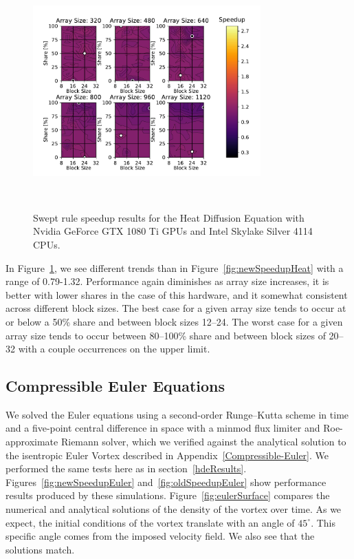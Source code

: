 \documentclass[preprints,article,accept,moreauthors,pdftex]{Definitions/mdpi}
\def\oldCPU{Intel Skylake Silver 4114} %
\def\oldGPU{Nvidia GeForce GTX 1080 Ti}
\begin{document}
\begin{figure}[htbp]
    \centering
    \includegraphics[height=9cm,width=0.78\textwidth, trim={0.75cm 0.4cm 0.8cm 0.7cm},clip]{figs/speedUpheatOld.pdf}
    \caption{Swept rule speedup results for the Heat Diffusion Equation with \oldGPU{} GPUs and \oldCPU{} CPUs.}
    \label{fig:oldSpeedupHeat} 
\end{figure}


In Figure~\ref{fig:oldSpeedupHeat}, we see different trends than in Figure~\ref{fig:newSpeedupHeat} with a range of 0.79-1.32. 
Performance again diminishes as array size increases, it is better with lower shares in the case of this hardware, and it somewhat consistent across different block sizes. The best case for a given array size tends to occur at or below a 50\% share and between block sizes 12--24. 
The worst case for a given array size tends to occur between 80--100\% share and between block sizes of 20--32 with a couple occurrences on the upper limit.

\subsection{Compressible Euler Equations}
\label{eulerVortexResults}

We solved the Euler equations using a second-order Runge--Kutta scheme in time and a five-point central difference in space with a minmod flux limiter and Roe-approximate Riemann solver, which we verified against the analytical solution to the isentropic Euler Vortex described in Appendix~\ref{Compressible-Euler}. 
We performed the same tests here as in section~\ref{hdeResults}. Figures~\ref{fig:newSpeedupEuler} and~\ref{fig:oldSpeedupEuler} show performance results produced by these simulations. Figure~\ref{fig:eulerSurface} compares the numerical and analytical solutions of the density of the vortex over time. As we expect, the initial conditions of the vortex translate with an angle of $45^\circ$. This specific angle comes from the imposed velocity field. We also see that the solutions match.
\end{document}
